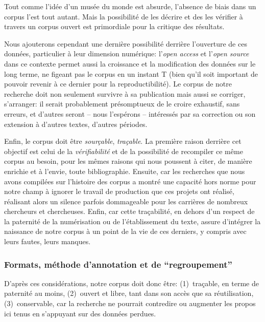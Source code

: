 Tout comme l'idée d'un musée du monde est absurde, l'absence de biais dans un corpus l'est tout autant. Mais la possibilité de les décrire et des les vérifier à travers un corpus ouvert est primordiale pour la critique des résultats.

Nous ajouterons cependant une dernière possibilité derrière l'ouverture de ces données, particulier à leur dimension numérique: l'\textit{open access} et l'\textit{open source} dans ce contexte permet aussi la croissance et la modification des données sur le long terme, ne figeant pas le corpus en un instant T (bien qu'il soit important de pouvoir revenir à ce dernier pour la reproductibilité). Le corpus de notre recherche doit non seulement survivre à sa publication mais aussi se corriger, s'arranger: il serait probablement présomptueux de le croire exhaustif, sans erreurs, et d'autres seront -- nous l'espérons -- intéressés par sa correction ou son extension à d'autres textes, d'autres périodes.

Enfin, le corpus doit être \textit{sourçable}, \textit{traçable}. La première raison derrière cet objectif est celui de la \textit{vérifiabilité} et de la possibilité de recompiler ce même corpus au besoin, pour les mêmes raisons qui nous poussent à citer, de manière enrichie et à l'envie, toute bibliographie. Ensuite, car les recherches que nous avons compilées sur l'histoire des corpus a montré une capacité hors norme pour notre champ à ignorer le travail de production que ces projets ont réalisé, réalisant alors un silence parfois dommageable pour les carrières de nombreux chercheurs et chercheuses. Enfin, car cette traçabilité, en dehors d'un respect de la paternité de la numérisation ou de l'établissement du texte, assure d'intégrer la naissance de notre corpus à un point de la vie de ces derniers, y compris avec leurs fautes, leurs manques.

\subsubsection{Formats, méthode d’annotation et de “regroupement”}
\label{chap1:method-annotation}

D'après ces considérations, notre corpus doit donc être: (1)~traçable, en terme de paternité au moins, (2)~ouvert et libre, tant dans son accès que sa réutilisation, (3)~conservable, car la recherche ne pourrait contredire ou augmenter les propos ici tenus en s'appuyant sur des données perdues.

